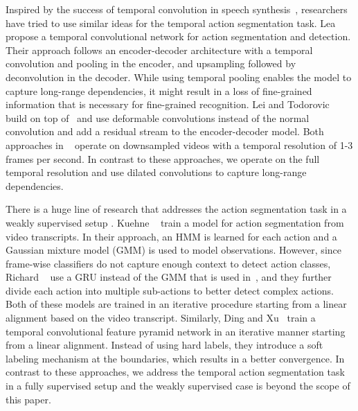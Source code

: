 \documentclass[10pt,twocolumn,letterpaper]{article}
\begin{document}
Inspired by the success of temporal convolution in speech synthesis~\cite{van2016wavenet}, 
researchers have tried to use similar ideas for the temporal action segmentation 
task. Lea \etal~\cite{Lea_2017_CVPR} propose a temporal convolutional network for action 
segmentation and detection. Their approach follows an encoder-decoder architecture with 
a temporal convolution and pooling in the encoder, and upsampling followed by deconvolution 
in the decoder. While using temporal pooling enables the model to capture long-range dependencies, 
it might result in a loss of fine-grained information that is necessary for fine-grained recognition. 
Lei and Todorovic~\cite{lei2018temporal} build on top of~\cite{Lea_2017_CVPR} and use deformable 
convolutions instead of the normal convolution and add a residual stream to the encoder-decoder model. 
Both approaches in ~\cite{Lea_2017_CVPR, lei2018temporal} operate on downsampled videos with 
a temporal resolution of 1-3 frames per second.
In contrast to these approaches, we operate on the full temporal resolution and 
use dilated convolutions to capture long-range dependencies.

There is a huge line of research that addresses the action segmentation task in 
a weakly supervised setup \cite{bojanowski2014weakly, huang2016connectionist, kuehne2017weakly, 
richard2017weakly, ding2018weakly}. 
Kuehne \etal~\cite{kuehne2017weakly} train a model for action segmentation from 
video transcripts. In their approach, an HMM is learned for each action and a Gaussian 
mixture model (GMM) is used to model observations. However, since frame-wise classifiers 
do not capture enough context to detect action classes, Richard \etal~\cite{richard2017weakly} 
use a GRU instead of the GMM that is used in~\cite{kuehne2017weakly}, and they further 
divide each action into multiple sub-actions to better detect complex actions. 
Both of these models are trained in an iterative procedure starting from a linear alignment 
based on the video transcript. Similarly, Ding and Xu~\cite{ding2018weakly} train a temporal 
convolutional feature pyramid network in an iterative manner starting from a linear alignment. 
Instead of using hard labels, they introduce a soft labeling mechanism at the 
boundaries, which results in a better convergence. In contrast to these approaches, we address 
the temporal action segmentation task in a fully supervised setup and the weakly 
supervised case is beyond the scope of this paper.

\end{document}
